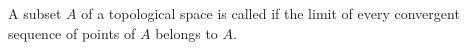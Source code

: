 A subset $A$ of a topological space is called  if the limit of every convergent sequence of points of $A$ belongs to $A$.
